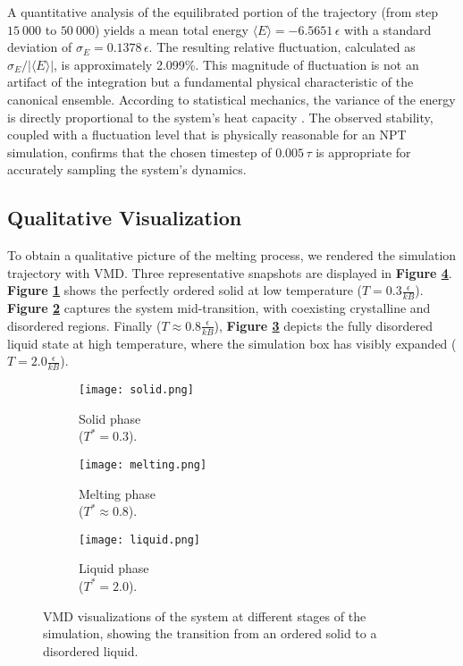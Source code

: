 \documentclass{article}
\begin{document}
A quantitative analysis of the equilibrated portion of the trajectory (from step $15\ 000$ to $50\ 000$) yields a mean total energy $\langle E \rangle = -6.5651\,\epsilon$ with a standard deviation of $\sigma_E = 0.1378\,\epsilon$. The resulting relative fluctuation, calculated as $\sigma_E/|\langle E \rangle|$, is approximately 2.099\%. This magnitude of fluctuation is not an artifact of the integration but a fundamental physical characteristic of the canonical ensemble. According to statistical mechanics, the variance of the energy is directly proportional to the system's heat capacity \cite{AllenTildesley}. The observed stability, coupled with a fluctuation level that is physically reasonable for an NPT simulation, confirms that the chosen timestep of $0.005\,\tau$ is appropriate for accurately sampling the system's dynamics. 


\subsection{Qualitative Visualization}

To obtain a qualitative picture of the melting process, we rendered the simulation trajectory with VMD. Three representative snapshots are displayed in \textbf{Figure \ref{fig:vmd_snapshots}}. \textbf{Figure \ref{fig:solid}} shows the perfectly ordered solid at low temperature ($T=0.3\frac{\epsilon}{kB}$). \textbf{Figure \ref{fig:melting}} captures the system mid-transition, with coexisting crystalline and disordered regions. Finally ($T\approx0.8\frac{\epsilon}{kB}$), \textbf{Figure \ref{fig:liquid}} depicts the fully disordered liquid state at high temperature, where the simulation box has visibly expanded ($T=2.0\frac{\epsilon}{kB}$).

\begin{figure}[h!]
    \centering
    \begin{subfigure}{.3\textwidth}
        \texttt{[image: solid.png]}
        \caption{Solid phase \\($T^*=0.3$).}
        \label{fig:solid}
    \end{subfigure}
    \begin{subfigure}{.3\textwidth}
        \texttt{[image: melting.png]}
        \caption{Melting phase \\($T^* \approx 0.8$).}
        \label{fig:melting}
    \end{subfigure}
    \begin{subfigure}{.3\textwidth}
        \texttt{[image: liquid.png]}
        \caption{Liquid phase \\($T^*=2.0$).}
        \label{fig:liquid}
    \end{subfigure}
    \caption{VMD visualizations of the system at different stages of the simulation, showing the transition from an ordered solid to a disordered liquid.}
    \label{fig:vmd_snapshots}
\end{figure}
\end{document}
